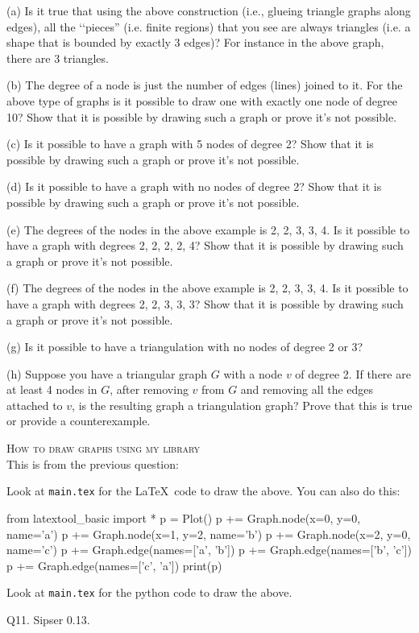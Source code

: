 (a) Is it true that using the above construction (i.e., glueing
triangle graphs along edges), all the \lq\lq pieces'' (i.e. finite regions) 
that you see 
are always triangles (i.e. a shape that is bounded by 
exactly 3 edges)? For instance in the above graph, there are 3 triangles.

(b) The degree of a node is just the number of edges (lines) joined to it.
For the above type of graphs is it possible to draw one 
with exactly one node of degree 10? 
Show that it is possible by drawing such a graph or prove it's not possible.

(c) Is it possible to have a graph with 5 nodes of degree 2? 
Show that it is possible by drawing such a graph or prove it's not possible.

(d) Is it possible to have a graph with no nodes of degree 2? 
Show that it is possible by drawing such a graph or prove it's not possible.

(e) The degrees of the nodes in the above example is 2, 2, 3, 3, 4.
Is it possible to have a graph with degrees 2, 2, 2, 2, 4?
Show that it is possible by drawing such a graph or prove it's not possible.

(f) The degrees of the nodes in the above example is 2, 2, 3, 3, 4.
Is it possible to have a graph with degrees 2, 2, 3, 3, 3?
Show that it is possible by drawing such a graph or prove it's not possible.

(g) Is it possible to have a triangulation with no nodes of degree 2 or 3?

(h) Suppose you have a triangular graph $G$ with a node $v$ of degree 2.
If there are at least 4 nodes in $G$, after removing $v$ from $G$
and removing all the edges attached to $v$, is the resulting graph
a triangulation graph? 
Prove that this is true or provide a counterexample.
       
\SOLUTION



\newpage
\textsc{How to draw graphs using my library}
\\

This is from the previous question:
\begin{center}
\end{center}
Look at \texttt{main.tex} for the \LaTeX\ code to draw the above.
You can also do this:
\begin{python}
from latextool_basic import *
p = Plot()
p += Graph.node(x=0, y=0, name='a')
p += Graph.node(x=1, y=2, name='b')
p += Graph.node(x=2, y=0, name='c')
p += Graph.edge(names=['a', 'b'])
p += Graph.edge(names=['b', 'c'])
p += Graph.edge(names=['c', 'a'])
print(p)
\end{python}
Look at \texttt{main.tex} for the python code to draw the above.

\newpage
Q11.
Sipser 0.13.

\SOLUTION




